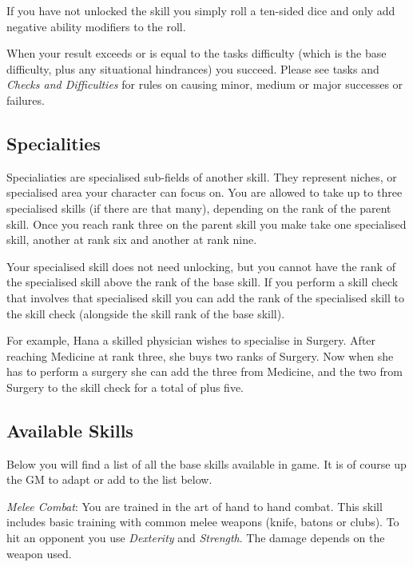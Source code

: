 \documentclass[11pt,a4paper,openany]{scrbook}
\begin{document}
If you have not unlocked the skill you simply roll a ten-sided dice and only
add negative ability modifiers to the roll.

When your result exceeds or is equal to the tasks difficulty (which is the base
difficulty, plus any situational hindrances) you succeed. Please see tasks and
\emph{Checks and Difficulties} for rules on causing minor, medium or major
successes or failures.

\subsection{Specialities}

Specialiaties are specialised sub-fields of another skill. They represent
niches, or specialised area your character can focus on. You are allowed to
take up to three specialised skills (if there are that many), depending on
the rank of the parent skill. Once you reach rank three on the parent skill
you make take one specialised skill, another at rank six and another at rank
nine.

Your specialised skill does not need unlocking, but you cannot have the rank
of the specialised skill above the rank of the base skill. If you perform a
skill check that involves that specialised skill you can add the rank of the
specialised skill to the skill check (alongside the skill rank of the base
skill).

For example, Hana a skilled physician wishes to specialise in Surgery. After
reaching Medicine at rank three, she buys two ranks of Surgery. Now when she
has to perform a surgery she can add the three from Medicine, and the two from
Surgery to the skill check for a total of plus five.

\subsection{Available Skills}

Below you will find a list of all the base skills available in game. It is of
course up the GM to adapt or add to the list below.


\linebreak
\emph{Melee Combat}: You are trained in the art of hand to hand combat. This
skill includes basic training with common melee weapons (knife, batons or
clubs). To hit an opponent you use \emph{Dexterity} and \emph{Strength}.
The damage depends on the weapon used.
\end{document}
